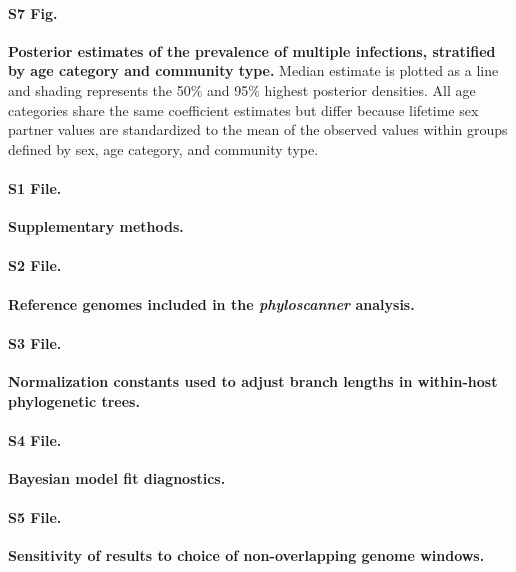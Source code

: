 \documentclass[10pt,letterpaper]{article}
\begin{document}
\paragraph*{S7 Fig.}
\label{empirical_sexpever_men_probMI}
{\bf Posterior estimates of the prevalence of multiple infections, stratified by age category and community type.} Median estimate is plotted as a line and shading represents the 50\% and 95\% highest posterior densities. All age categories share the same coefficient estimates but differ because lifetime sex partner values are standardized to the mean of the observed values within groups defined by sex, age category, and community type.
\newpage

\paragraph*{S1 File.}
\label{supp_methods}
{\bf Supplementary methods.}

\paragraph*{S2 File.}
\label{reference_genomes}
{\bf Reference genomes included in the \textit{phyloscanner} analysis.}

\paragraph*{S3 File.}
\label{normalization_constants}
{\bf Normalization constants used to adjust branch lengths in within-host phylogenetic trees.} 

\paragraph*{S4 File.}
\label{model_diagnostics}
{\bf Bayesian model fit diagnostics.}

\paragraph*{S5 File.}
\label{genome_window_sensitivity}
{\bf Sensitivity of results to choice of non-overlapping genome windows.}
\end{document}
